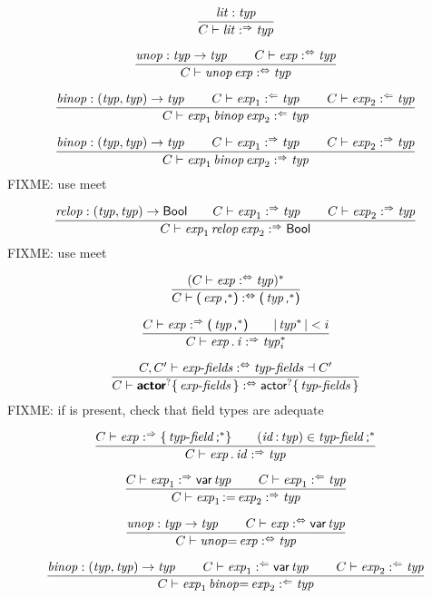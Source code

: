 $$
\frac{
  \x{lit} : \x{typ}
}{
  C \vdash \x{lit} \synth \x{typ}
}
$$

$$
\frac{
  \x{unop} : \x{typ} \Kto \x{typ}
  \qquad
  C \vdash \x{exp} \analsynth \x{typ}
}{
  C \vdash \x{unop} \x{exp} \analsynth \x{typ}
}
$$

$$
\frac{
  \x{binop} : (\x{typ}, \x{typ}) \Kto \x{typ}
  \qquad
  C \vdash \x{exp}_1 \anal \x{typ}
  \qquad
  C \vdash \x{exp}_2 \anal \x{typ}
}{
  C \vdash \x{exp}_1 \x{binop} \x{exp}_2 \anal \x{typ}
}
$$

$$
\frac{
  \x{binop} : (\x{typ}, \x{typ}) \Kto \x{typ}
  \qquad
  C \vdash \x{exp}_1 \synth \x{typ}
  \qquad
  C \vdash \x{exp}_2 \synth \x{typ}
}{
  C \vdash \x{exp}_1 \x{binop} \x{exp}_2 \synth \x{typ}
}
$$
FIXME: use meet

$$
\frac{
  \x{relop} : (\x{typ}, \x{typ}) \Kto \K{Bool}
  \qquad
  C \vdash \x{exp}_1 \synth \x{typ}
  \qquad
  C \vdash \x{exp}_2 \synth \x{typ}
}{
  C \vdash \x{exp}_1 \x{relop} \x{exp}_2 \synth \K{Bool}
}
$$
FIXME: use meet

$$
\frac{
  (C \vdash \x{exp} \analsynth \x{typ})^\ast
}{
  C \vdash \K( \x{exp}\K,^\ast \K) \analsynth \K( \x{typ}\K,^\ast \K)
}
$$

$$
\frac{
  C \vdash \x{exp} \synth \K( \x{typ}\K,^\ast \K)
  \qquad
  |\x{typ}^\ast| < i
}{
  C \vdash \x{exp} \K. \x{i} \synth \x{typ}^\ast_i
}
$$

$$
\frac{
  C, C' \vdash \x{exp-fields} \analsynth \x{typ-fields} \dashv C'
}{
  C \vdash \KK{actor}^? \K\{ \x{exp-fields} \K\} \analsynth \K{actor}^? \K\{ \x{typ-fields} \K\}
}
$$
FIXME: if  is present, check that field types are adequate

$$
\frac{
  C \vdash \x{exp} \synth \K\{ \x{typ-field}\K;^\ast \K\}
  \qquad
  (\x{id} \K: \x{typ}) \in \x{typ-field}\K;^\ast
}{
  C \vdash \x{exp} \K. \x{id} \synth \x{typ}
}
$$

$$
\frac{
  C \vdash \x{exp}_1 \synth \K{var} \x{typ}
  \qquad
  C \vdash \x{exp}_1 \anal \x{typ}
}{
  C \vdash \x{exp}_1 \K{:=} \x{exp}_2 \synth \x{typ}
}
$$

%
$$
\frac{
  \x{unop} : \x{typ} \Kto \x{typ}
  \qquad
  C \vdash \x{exp} \analsynth \K{var} \x{typ}
}{
  C \vdash \x{unop}{\!\K=} \x{exp} \analsynth \x{typ}
}
$$

$$
\frac{
  \x{binop} : (\x{typ}, \x{typ}) \Kto \x{typ}
  \qquad
  C \vdash \x{exp}_1 \anal \K{var} \x{typ}
  \qquad
  C \vdash \x{exp}_2 \anal \x{typ}
}{
  C \vdash \x{exp}_1 \x{binop}{\!\K=} \x{exp}_2 \anal \x{typ}
}
$$

